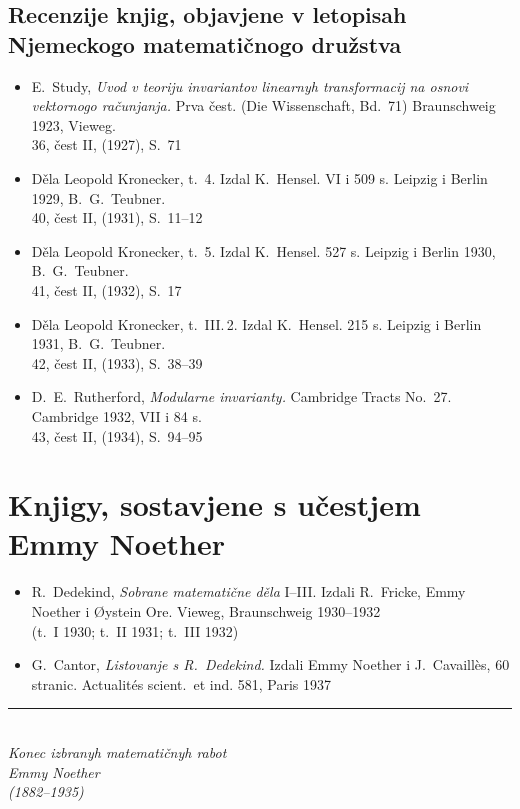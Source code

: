 \documentclass[11pt]{article}
\newcommand{\foreign}[1]{#1}
\begin{document}
\subsection*{Recenzije knjig, objavjene v letopisah Njemeckogo matematičnogo družstva}

\begin{itemize}[leftmargin=1.5em,itemsep=0.2em]
\item E.\ Study, \textit{Uvod v teoriju invariantov linearnyh transformacij na osnovi vektornogo računjanja.} Prva čest. (\foreign{Die Wissenschaft}, Bd.~71) \foreign{Braunschweig} 1923, \foreign{Vieweg}.\\
36, čest II, (1927), S.~71

\item Děla Leopold Kronecker, t.~4. Izdal K.\ Hensel. VI i 509 s. Leipzig i Berlin 1929, B.\ G.\ Teubner.\\
40, čest II, (1931), S.~11--12

\item Děla Leopold Kronecker, t.~5. Izdal K.\ Hensel. 527 s. Leipzig i Berlin 1930, B.\ G.\ Teubner.\\
41, čest II, (1932), S.~17

\item Děla Leopold Kronecker, t.~III.\,2. Izdal K.\ Hensel. 215 s. Leipzig i Berlin 1931, B.\ G.\ Teubner.\\
42, čest II, (1933), S.~38--39

\item D.\ E.\ Rutherford, \textit{Modularne invarianty.} \foreign{Cambridge Tracts No.~27.} Cambridge 1932, VII i 84 s.\\
43, čest II, (1934), S.~94--95
\end{itemize}

\newpage
\section*{Knjigy, sostavjene s učestjem Emmy Noether}

\begin{itemize}[leftmargin=1.5em,itemsep=0.5em]
\item R.\ Dedekind, \textit{Sobrane matematične děla} I--III. Izdali R.\ Fricke, Emmy Noether i \foreign{Øystein Ore}. \foreign{Vieweg}, \foreign{Braunschweig} 1930--1932\\
(t.~I 1930; t.~II 1931; t.~III 1932)

\item G.\ Cantor, \textit{Listovanje s R.\ Dedekind.} Izdali Emmy Noether i \foreign{J.\ Cavaillès}, 60 stranic. \foreign{Actualités scient.\ et ind.} 581, Paris 1937
\end{itemize}

\vfill

\begin{center}
\rule{0.5\textwidth}{0.4pt}\\[1em]
\textit{Konec izbranyh matematičnyh rabot}\\[0.5em]
\textit{Emmy Noether}\\[0.5em]
\textit{(1882--1935)}
\end{center}
\end{document}

